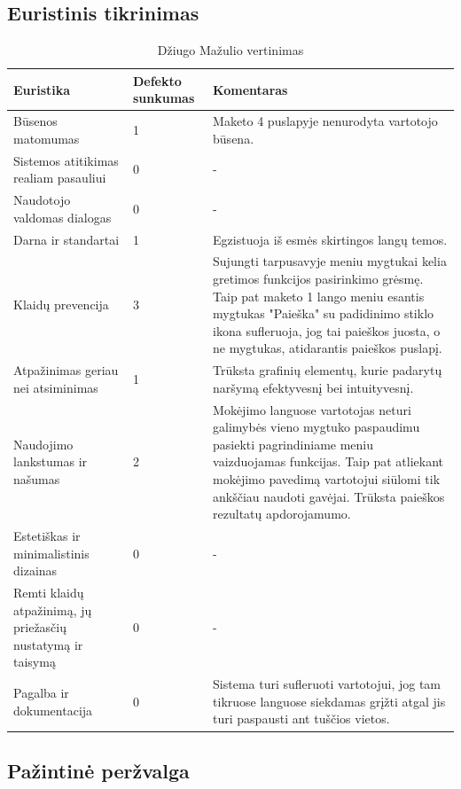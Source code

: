\documentclass[oneside]{VUMIFPSkursinis}
\begin{document}
\subsection{Euristinis tikrinimas}
\begin{center}
\begin{longtable}[!htb]{|p{3.5cm}|p{1.9cm}|p{9.6cm}|}
	\caption{Džiugo Mažulio vertinimas}
	\endfirsthead
	\endhead
  \hline
	Euristika & Defekto sunkumas & Komentaras \\ \hline
	Būsenos matomumas & 1 & Maketo 4 puslapyje nenurodyta vartotojo būsena. \\ \hline
	Sistemos atitikimas realiam pasauliui & 0 & - \\ \hline
	Naudotojo valdomas dialogas & 0 & - \\ \hline
	Darna ir standartai & 1 & Egzistuoja iš esmės skirtingos langų temos. \\ \hline
	Klaidų prevencija & 3 & Sujungti tarpusavyje meniu mygtukai kelia gretimos funkcijos pasirinkimo grėsmę. Taip pat maketo 1 lango meniu esantis mygtukas "Paieška" su padidinimo stiklo ikona sufleruoja, jog tai paieškos juosta, o ne mygtukas, atidarantis paieškos puslapį.\\ \hline
	Atpažinimas geriau nei atsiminimas & 1 & Trūksta grafinių elementų, kurie padarytų naršymą efektyvesnį bei intuityvesnį. \\ \hline
	Naudojimo lankstumas ir našumas & 2 & Mokėjimo languose vartotojas neturi galimybės vieno mygtuko paspaudimu pasiekti pagrindiniame meniu vaizduojamas funkcijas. Taip pat atliekant mokėjimo pavedimą vartotojui siūlomi tik ankščiau naudoti gavėjai. Trūksta paieškos rezultatų apdorojamumo. \\ \hline
	Estetiškas ir minimalistinis dizainas & 0 & - \\ \hline
	Remti klaidų atpažinimą, jų priežasčių nustatymą ir taisymą & 0 & - \\ \hline
	Pagalba ir dokumentacija & 0 & Sistema turi sufleruoti vartotojui, jog tam tikruose languose siekdamas grįžti atgal jis turi paspausti ant tuščios vietos. \\ \hline
\end{longtable}
\end{center}

\subsection{Pažintinė peržvalga}
\end{document}
